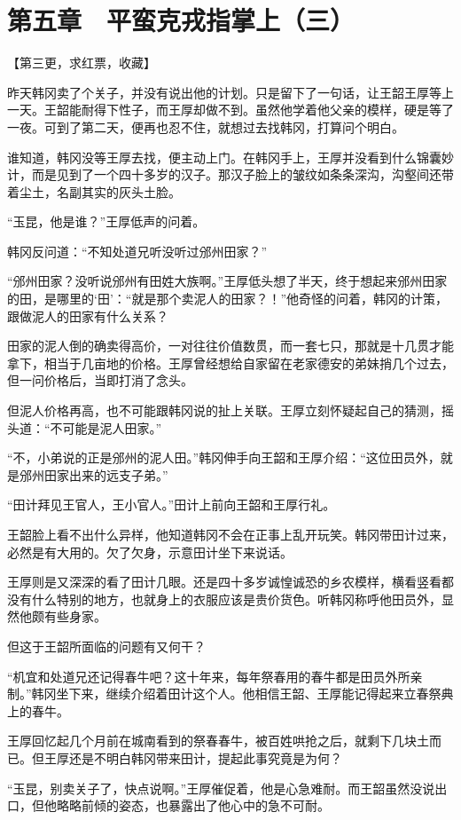 \section{第五章　平蛮克戎指掌上（三）}

【第三更，求红票，收藏】

昨天韩冈卖了个关子，并没有说出他的计划。只是留下了一句话，让王韶王厚等上一天。王韶能耐得下性子，而王厚却做不到。虽然他学着他父亲的模样，硬是等了一夜。可到了第二天，便再也忍不住，就想过去找韩冈，打算问个明白。

谁知道，韩冈没等王厚去找，便主动上门。在韩冈手上，王厚并没看到什么锦囊妙计，而是见到了一个四十多岁的汉子。那汉子脸上的皱纹如条条深沟，沟壑间还带着尘土，名副其实的灰头土脸。

“玉昆，他是谁？”王厚低声的问着。

韩冈反问道：“不知处道兄听没听过邠州田家？”

“邠州田家？没听说邠州有田姓大族啊。”王厚低头想了半天，终于想起来邠州田家的田，是哪里的‘田’：“就是那个卖泥人的田家？！”他奇怪的问着，韩冈的计策，跟做泥人的田家有什么关系？

田家的泥人倒的确卖得高价，一对往往价值数贯，而一套七只，那就是十几贯才能拿下，相当于几亩地的价格。王厚曾经想给自家留在老家德安的弟妹捎几个过去，但一问价格后，当即打消了念头。

但泥人价格再高，也不可能跟韩冈说的扯上关联。王厚立刻怀疑起自己的猜测，摇头道：“不可能是泥人田家。”

“不，小弟说的正是邠州的泥人田。”韩冈伸手向王韶和王厚介绍：“这位田员外，就是邠州田家出来的远支子弟。”

“田计拜见王官人，王小官人。”田计上前向王韶和王厚行礼。

王韶脸上看不出什么异样，他知道韩冈不会在正事上乱开玩笑。韩冈带田计过来，必然是有大用的。欠了欠身，示意田计坐下来说话。

王厚则是又深深的看了田计几眼。还是四十多岁诚惶诚恐的乡农模样，横看竖看都没有什么特别的地方，也就身上的衣服应该是贵价货色。听韩冈称呼他田员外，显然他颇有些身家。

但这于王韶所面临的问题有又何干？

“机宜和处道兄还记得春牛吧？这十年来，每年祭春用的春牛都是田员外所亲制。”韩冈坐下来，继续介绍着田计这个人。他相信王韶、王厚能记得起来立春祭典上的春牛。

王厚回忆起几个月前在城南看到的祭春春牛，被百姓哄抢之后，就剩下几块土而已。但王厚还是不明白韩冈带来田计，提起此事究竟是为何？

“玉昆，别卖关子了，快点说啊。”王厚催促着，他是心急难耐。而王韶虽然没说出口，但他略略前倾的姿态，也暴露出了他心中的急不可耐。

